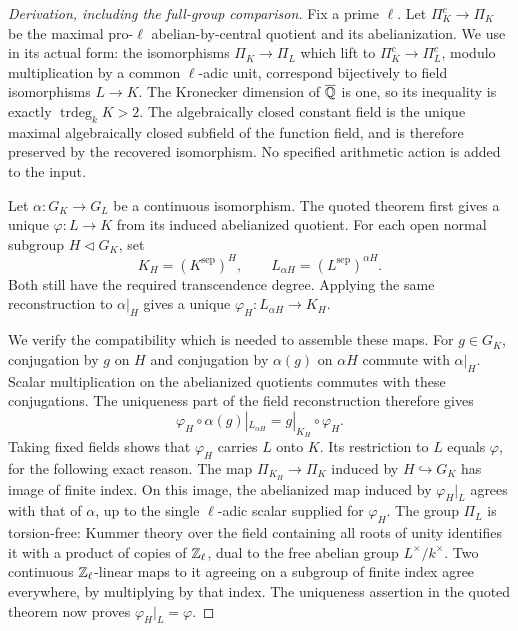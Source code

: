 \begin{proof}[Derivation, including the full-group comparison]
Fix a prime $\ell$.  Let $\Pi_K^c\to\Pi_K$ be the maximal pro-$\ell$
abelian-by-central quotient and its abelianization.  We use
\cite[Theorem 1.2(4), with Theorem 1.1]{Pop2018Divisorial} in its
actual form: the isomorphisms $\Pi_K\to\Pi_L$ which lift to
$\Pi_K^c\to\Pi_L^c$, modulo multiplication by a common
$\ell$-adic unit, correspond bijectively to field isomorphisms
$L\to K$.  The Kronecker dimension of $\overline{\mathbb Q}$ is one,
so its inequality is exactly $\operatorname{trdeg}_kK>2$.
The algebraically closed constant field is the unique maximal
algebraically closed subfield of the function field, and is
therefore preserved by the recovered isomorphism.  No specified
arithmetic action is added to the input.

Let $\alpha:G_K\to G_L$ be a continuous isomorphism.  The quoted
theorem first gives a unique $\varphi:L\to K$ from its induced
abelianized quotient.  For each open normal subgroup $H\triangleleft
G_K$, set
\[
 K_H=(K^{\mathrm{sep}})^H,\qquad
 L_{\alpha H}=(L^{\mathrm{sep}})^{\alpha H}.
\]
Both still have the required transcendence degree.  Applying the
same reconstruction to $\alpha|_H$ gives a unique
$\varphi_H:L_{\alpha H}\to K_H$.

We verify the compatibility which is needed to assemble these
maps.  For $g\in G_K$, conjugation by $g$ on $H$ and conjugation
by $\alpha(g)$ on $\alpha H$ commute with $\alpha|_H$.
Scalar multiplication on the abelianized quotients commutes with
these conjugations.  The uniqueness part of the field
reconstruction therefore gives
\[
 \varphi_H\circ\alpha(g)|_{L_{\alpha H}}
       =g|_{K_H}\circ\varphi_H.                            \tag{E.T20}
\]
Taking fixed fields shows that $\varphi_H$ carries $L$ onto $K$.
Its restriction to $L$ equals $\varphi$, for the following exact
reason.  The map $\Pi_{K_H}\to\Pi_K$ induced by $H\hookrightarrow
G_K$ has image of finite index.  On this image, the abelianized
map induced by $\varphi_H|_L$ agrees with that of $\alpha$, up to
the single $\ell$-adic scalar supplied for $\varphi_H$.
The group $\Pi_L$ is torsion-free: Kummer theory over the field
containing all roots of unity identifies it with a product of
copies of $\mathbb Z_\ell$, dual to the free abelian group $L^\times/k^\times$.
Two continuous $\mathbb Z_\ell$-linear maps to it agreeing on a subgroup
of finite index agree everywhere, by multiplying by that index.
The uniqueness assertion in the quoted theorem now proves
$\varphi_H|_L=\varphi$.


\end{proof}
